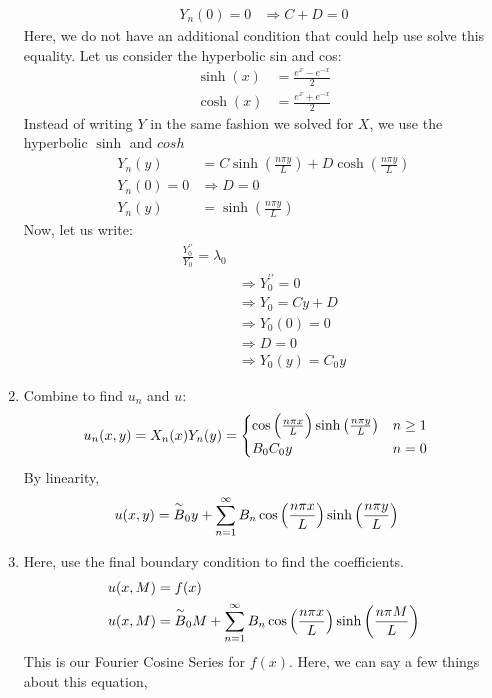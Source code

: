 \documentclass{article}
\newcommand{\twiddle}[1]{\overset{\sim}{#1}}
\begin{document}
\begin{enumerate}
\begin{align}
  Y_n(0) = 0 & \Rightarrow C + D = 0
\end{align}
Here, we do not have an additional condition that could help use solve this equality. Let us consider the hyperbolic sin and cos:
\begin{align}
  \sinh(x) & = \frac{e^x - e^{-x}}{2}\\
  \cosh(x) & = \frac{e^x + e^{-x}}{2}
\end{align}
Instead of writing $Y$ in the same fashion we solved for $X$, we use the hyperbolic $\sinh$ and $cosh$
\begin{align}
  Y_n(y) & = C \sinh \left(\frac{n \pi y}{L} \right) + D \cosh \left( \frac{n \pi y}{L} \right)\\
  Y_n(0) = 0 & \Rightarrow D = 0\\
  Y_n(y) & = \sinh \left( \frac{n \pi y}{L} \right)
\end{align}
Now, let us write:
\begin{align}
  \frac{Y^{\prime\prime}_0}{Y_0} = \lambda_0 &\\
  & \Rightarrow Y^{\prime\prime}_0 = 0\\
  & \Rightarrow Y_0 = Cy + D\\
  & \Rightarrow Y_0(0) = 0\\
  & \Rightarrow D = 0\\
  & \Rightarrow Y_0(y) = C_0 y
\end{align}
\item Combine to find $u_n$ and $u$:
\begin{align}
  u_n(x, y) = X_n(x)Y_n(y) & =
  \begin{cases}
    \cos \Big( \frac{n \pi x}{L} \Big) \sinh \left( \frac{n \pi y}{L} \right) & n \geq 1\\
    B_0C_0y & n = 0
  \end{cases}
\end{align}
By linearity,
\begin{align}
  u(x, y) & = \twiddle{B}_0 y + \sum^\infty_{n = 1} B_n \FC \sinh \left( \frac{n \pi y}{L} \right)
\end{align}
\item Here, use the final boundary condition to find the coefficients.
\begin{align}
  u(x, M) & = f(x)\\
  u(x, M) & = \twiddle{B}_0 M + \sum^\infty_{n = 1} B_n \FC \sinh\left( \frac{n \pi M}{L} \right)
\end{align}
This is our Fourier Cosine Series for $f(x)$. Here, we can say a few things about this equation,
\begin{itemize}

\end{itemize}
\end{enumerate}
\end{document}
